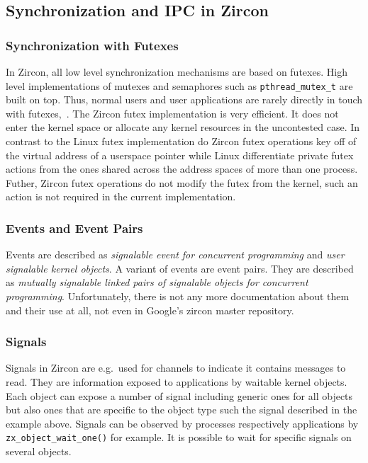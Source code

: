\subsection{Synchronization and IPC in Zircon}

\subsubsection*{Synchronization with Futexes}
In Zircon, all low level synchronization mechanisms are based on futexes.
High level implementations of mutexes and semaphores such as \texttt{pthread\_mutex\_t} are built on top.
Thus, normal users and user applications are rarely directly in touch with futexes\cite{zircon-concepts},~\cite{zircon-futex}.
The Zircon futex implementation is very efficient.
It does not enter the kernel space or allocate any kernel resources in the uncontested case.
In contrast to the Linux futex implementation do Zircon futex operations key off of the virtual address of a userspace pointer while Linux differentiate private futex actions from the ones shared across the address spaces of more than one process.
Futher, Zircon futex operations do not modify the futex from the kernel, such an action is not required in the current implementation\cite{zircon-futex}.

\subsubsection*{Events and Event Pairs}
Events are described as \textit{signalable event for concurrent programming}\cite{zircon-event} and \textit{user signalable kernel objects}\cite{zircon-event}.
A variant of events are event pairs.
They are described as \textit{mutually signalable linked pairs of signalable objects for concurrent programming}\cite{zircon-eventpair}.
Unfortunately, there is not any more documentation about them and their use at all, not even in Google's zircon master repository.

\subsubsection*{Signals}
Signals in Zircon are e.g.\ used for channels to indicate it contains messages to read.
They are information exposed to applications by waitable kernel objects.
Each object can expose a number of signal including generic ones for all objects but also ones that are specific to the object type such the signal described in the example above.
Signals can be observed by processes respectively applications by \texttt{zx\_object\_wait\_one()} for example.
It is possible to wait for specific signals on several objects\cite{zircon-signals}.

